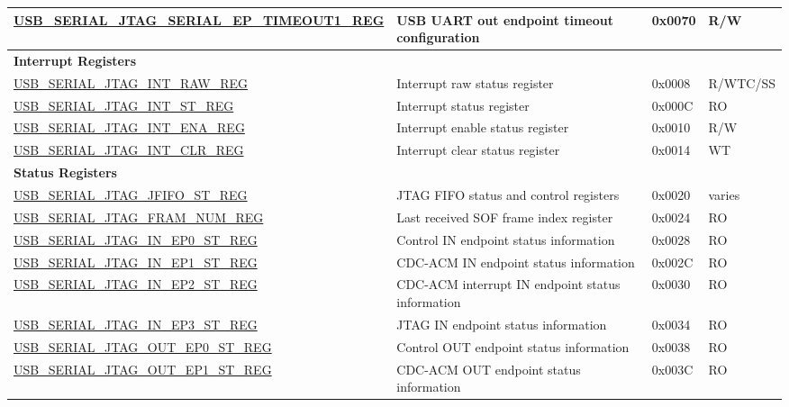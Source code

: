 \begin{longtable}{ | p{7.3cm} | p{5.7cm} | p{1.2cm} | p{1.5cm} | }
    \hyperref[regdesc:USBSERIALJTAGSERIALEPTIMEOUT1REG]{USB\_SERIAL\_JTAG\_SERIAL\_EP\_TIMEOUT1\_REG} & USB UART out endpoint timeout configuration & 0x0070 & R/W \\ \hline
    \multicolumn{4}{|l|}{\textbf{Interrupt Registers}} \\ \hline
    \hyperref[regdesc:USBSERIALJTAGINTRAWREG]{USB\_SERIAL\_JTAG\_INT\_RAW\_REG} & Interrupt raw status register & 0x0008 & R/WTC/SS \\ \hline
    \hyperref[regdesc:USBSERIALJTAGINTSTREG]{USB\_SERIAL\_JTAG\_INT\_ST\_REG} & Interrupt status register & 0x000C & RO \\ \hline
    \hyperref[regdesc:USBSERIALJTAGINTENAREG]{USB\_SERIAL\_JTAG\_INT\_ENA\_REG} & Interrupt enable status register & 0x0010 & R/W \\ \hline
    \hyperref[regdesc:USBSERIALJTAGINTCLRREG]{USB\_SERIAL\_JTAG\_INT\_CLR\_REG} & Interrupt clear status register & 0x0014 & WT \\ \hline
    \multicolumn{4}{|l|}{\textbf{Status Registers}} \\ \hline
    \hyperref[regdesc:USBSERIALJTAGJFIFOSTREG]{USB\_SERIAL\_JTAG\_JFIFO\_ST\_REG} & JTAG FIFO status and control registers & 0x0020 & varies \\ \hline
    \hyperref[regdesc:USBSERIALJTAGFRAMNUMREG]{USB\_SERIAL\_JTAG\_FRAM\_NUM\_REG} & Last received SOF frame index register & 0x0024 & RO \\ \hline
    \hyperref[regdesc:USBSERIALJTAGINEP0STREG]{USB\_SERIAL\_JTAG\_IN\_EP0\_ST\_REG} & Control IN endpoint status information & 0x0028 & RO \\ \hline
    \hyperref[regdesc:USBSERIALJTAGINEP1STREG]{USB\_SERIAL\_JTAG\_IN\_EP1\_ST\_REG} & CDC-ACM IN endpoint status information & 0x002C & RO \\ \hline
    \hyperref[regdesc:USBSERIALJTAGINEP2STREG]{USB\_SERIAL\_JTAG\_IN\_EP2\_ST\_REG} & CDC-ACM interrupt IN endpoint status information & 0x0030 & RO \\ \hline
    \hyperref[regdesc:USBSERIALJTAGINEP3STREG]{USB\_SERIAL\_JTAG\_IN\_EP3\_ST\_REG} & JTAG IN endpoint status information & 0x0034 & RO \\ \hline
    \hyperref[regdesc:USBSERIALJTAGOUTEP0STREG]{USB\_SERIAL\_JTAG\_OUT\_EP0\_ST\_REG} & Control OUT endpoint status information & 0x0038 & RO \\ \hline
    \hyperref[regdesc:USBSERIALJTAGOUTEP1STREG]{USB\_SERIAL\_JTAG\_OUT\_EP1\_ST\_REG} & CDC-ACM OUT endpoint status information & 0x003C & RO \\ \hline

\end{longtable}
